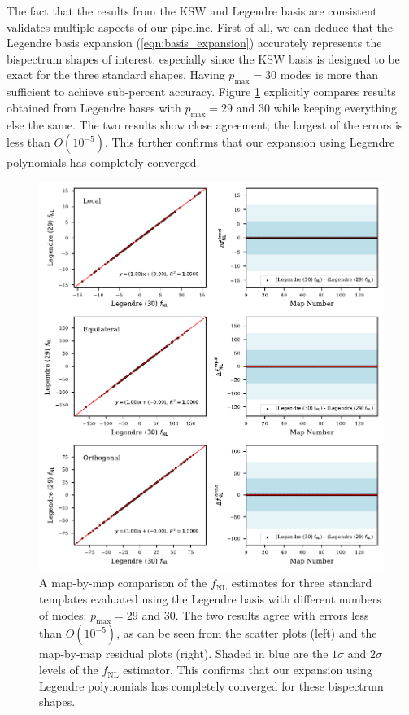 The fact that the results from the KSW and Legendre basis are consistent validates multiple aspects of our pipeline. First of all, we can deduce that the Legendre basis expansion (\ref{eqn:basis_expansion}) accurately represents the bispectrum shapes of interest, especially since the KSW basis is designed to be exact for the three standard shapes. Having $p_\text{max}=30$ modes is more than sufficient to achieve sub-percent accuracy. Figure \ref{fig:map_by_map_Legendre_30_29} explicitly compares results obtained from Legendre bases with $p_\text{max}=29$ and $30$ while keeping everything else the same. The two results show close agreement; the largest of the errors is less than $O(10^{-5})$. This further confirms that our expansion using Legendre polynomials has completely converged.

\begin{figure}[htbp!] 
	\centering    
	\includegraphics{map_by_map_Legendre_30_29.pdf}
	\caption{A map-by-map comparison of the $f_\text{NL}$ estimates for three standard templates evaluated using the Legendre basis with different numbers of modes: $p_\text{max}=29$ and $30$. The two results agree with errors less than $O(10^{-5})$, as can be seen from the scatter plots (left) and the map-by-map residual plots (right). Shaded in blue are the $1\sigma$ and $2\sigma$ levels of the $f_\text{NL}$ estimator. This confirms that our expansion using Legendre polynomials has completely converged for these bispectrum shapes.}
	\label{fig:map_by_map_Legendre_30_29}
\end{figure}

